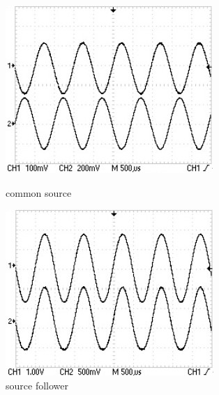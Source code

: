 \documentclass[10pt,a4paper]{article}
\begin{document}
\begin{figure}[h!]
	\centering
	\begin{minipage}[h!]{0.5\textwidth}
		\centering
		\includegraphics[width=\textwidth]{../oscilloscopio/inversione_fase.jpg}
		\caption{common source}
			\label{fig:controfase}
	\end{minipage}
	\begin{minipage}[h!]{0.49\textwidth}
		\centering
		\includegraphics[width=\textwidth]{../oscilloscopio/fase.jpg}
		\caption{source follower}
			\label{infase}
	\end{minipage}

\end{figure}
\end{document}
